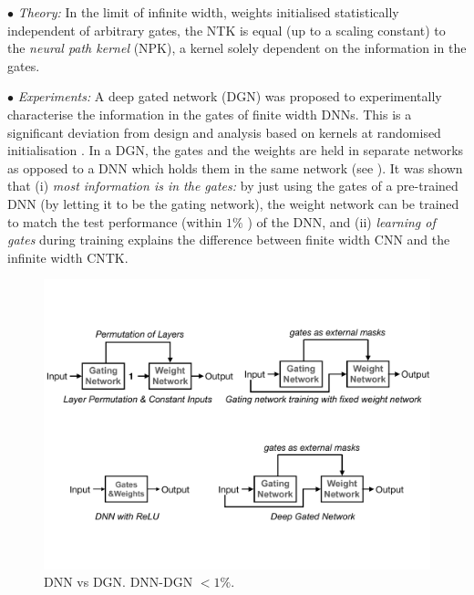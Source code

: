 $\bullet$ \emph{Theory:} In the limit of infinite width, weights initialised statistically independent of arbitrary gates, the NTK is equal (up to a scaling constant) to the \emph{neural path kernel} (NPK), a kernel solely dependent on the information in the gates. %

$\bullet$ \emph{Experiments:} A deep gated network (DGN) was proposed to experimentally characterise the information in the gates of finite width DNNs. This is a significant deviation from design and analysis based on kernels at randomised initialisation \cite{arora2019exact,fcgp,convgp}. In a DGN, the gates and the weights are held in separate networks as opposed to a DNN which holds them in the same network (see ).  It was shown that (i)  \emph{most information is in the gates:} by just using the gates of a pre-trained DNN (by letting it to be the gating network), the weight network can be trained to match the test performance (within $1\%$ ) of the DNN, and (ii) \emph{learning of gates} during training explains the difference between finite width CNN and the infinite width CNTK.  %
\FloatBarrier
\begin{figure}[h]
\centering
\includegraphics[scale=0.25]{figs/dnn-dgn.pdf}
\caption{\small{DNN vs DGN. DNN-DGN $<1\%$.}}
\label{fig:dgn}
\end{figure}
